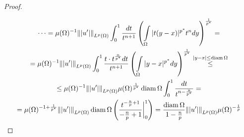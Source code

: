 \documentclass[12pt,a4paper]{article}
\newcommand{\intset}[1]{\int\limits_{#1}}
\DeclareMathOperator\diam{diam}
\begin{document}
\begin{proof}
\begin{multline*}
	\end{multline*}
	\begin{multline*}
		\cdots = \mu(\Omega)^{-1} \norm{|u^\prime|}_{L^p (\Omega)} \int_{0}^{1}{\frac{dt}{t^{n+1}} \left(\intset{\Omega}{|t(y - x)|^{p^*} t^n dy}\right)^{\frac{1}{p^*}}} = \\ =
		\mu(\Omega)^{-1} \norm{|u^\prime|}_{L^p (\Omega)} \int_{0}^{1}{\frac{t\cdot t^{\frac{n}{p^*}}dt}{t^{n+1}} \left(\intset{\Omega}{|y - x|^{p^*} dy}\right)^{\frac{1}{p^*}}} \overset{|y-x| \leq \diam \Omega}{\leq} \\ \leq 
		\mu(\Omega)^{-1} \norm{|u^\prime|}_{L^p (\Omega)} \mu(\Omega)^{\frac{1}{p^*}} \diam \Omega \int_{0}^{1}{\frac{dt}{t^{n-\frac{n}{p^*}}}} = \\ =
		\mu(\Omega)^{-1 + \frac{1}{p^*}} \norm{|u^\prime|}_{L^p (\Omega)} \diam \Omega \left(\frac{t^{-\frac{n}{p} + 1}}{-\frac{n}{p} + 1} \bigg\rvert_0^1\right) = \frac{\diam \Omega}{1 - \frac{n}{p}} \norm{|u^\prime|}_{L^p (\Omega)} \mu(\Omega)^{-\frac{1}{p}}
	\end{multline*}
\end{proof}
\end{document}
